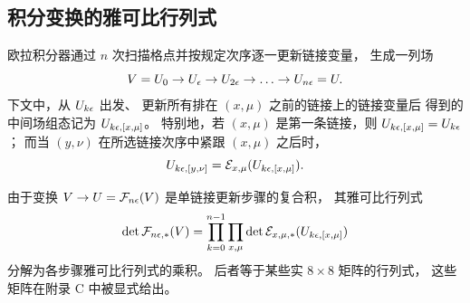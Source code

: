 \subsection{积分变换的雅可比行列式}

欧拉积分器通过 $n$ 次扫描格点并按规定次序逐一更新链接变量，
生成一列场
\begin{equation}
  V=U_0\to U_{\epsilon}\to U_{2\epsilon}\to\ldots\to U_{n\epsilon}=U.
\end{equation}
下文中，从 $U_{k\epsilon}$ 出发、
更新所有排在 $(x,\mu)$ 之前的链接上的链接变量后
得到的中间场组态记为 $U_{k\epsilon,[x,\mu]}$。
特别地，若 $(x,\mu)$ 是第一条链接，则 $U_{k\epsilon,[x,\mu]}=U_{k\epsilon}$；
而当 $(y,\nu)$ 在所选链接次序中紧跟 $(x,\mu)$ 之后时，
\begin{equation}
  U_{k\epsilon,[y,\nu]}=\mathcal{E}_{x,\mu}(U_{k\epsilon,[x,\mu]}).
\end{equation}

由于变换 $V\to U=\mathcal{F}_{n\epsilon}(V)$
是单链接更新步骤的复合积，
其雅可比行列式
\begin{equation}
  \det\mathcal{F}_{n\epsilon,*}(V)=
  \prod_{k=0}^{n-1}
  \prod_{x,\mu}\det\mathcal{E}_{x,\mu,*}(U_{k\epsilon,[x,\mu]})
\end{equation}
分解为各步骤雅可比行列式的乘积。
后者等于某些实 $8\times8$ 矩阵的行列式，
这些矩阵在附录 C 中被显式给出。
